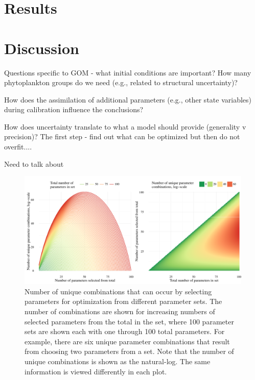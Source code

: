 \documentclass[letterpaper,12pt,oneside]{article}\usepackage[]{graphicx}\usepackage[]{color}
\begin{document}
\section{Results}

\section{Discussion}

Questions specific to GOM - what initial conditions are important? How many phytoplankton groups do we need (e.g., related to structural uncertainty)?

How does the assimilation of additional parameters (e.g., other state variables) during calibration influence the conclusions?

How does uncertainty translate to what a model should provide (generality v precision)?  The first step - find out what can be optimized but then do not overfit....

Need to talk about \cite{Flynn05}

\clearpage
\begin{singlespace}


\end{singlespace}
\clearpage

\begin{figure}[!ht]

{\centering \includegraphics[width=\textwidth]{figs/unnamed-chunk-3-1} 

}

\caption[Number of unique combinations that can occur by selecting parameters for optimization from different parameter sets]{Number of unique combinations that can occur by selecting parameters for optimization from different parameter sets.  The number of combinations are shown for increasing numbers of selected parameters from the total in the set, where 100 parameter sets are shown each with one through 100 total parameters.  For example, there are six unique parameter combinations that result from choosing two parameters from a set.  Note that the number of unique combinations is shown as the natural-log.  The same information is viewed differently in each plot.}\label{fig:unnamed-chunk-3}
\end{figure}
\end{document}
